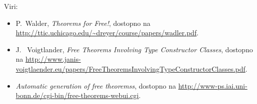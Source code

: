\documentclass{beamer}
\newcommand{\blue}[1]{\textcolor[rgb]{0,0,1}{#1}}
\newcommand{\red}[1]{\textcolor[rgb]{1,0,0}{#1}}
\begin{document}


\begin{frame}
Viri:
\begin{itemize}
\item P.~Walder, \emph{Theorems for Free!}, dostopno na \url{http://ttic.uchicago.edu/~dreyer/course/papers/wadler.pdf}.
\item J.~ Voigtlander, \emph{Free Theorems Involving Type Constructor Classes}, dostopno na \url{http://www.janis-voigtlaender.eu/papers/FreeTheoremsInvolvingTypeConstructorClasses.pdf}.
\item \emph{Automatic generation of free theoremss}, dostopno na \url{http://www-ps.iai.uni-bonn.de/cgi-bin/free-theorems-webui.cgi}.
\end{itemize}
\end{frame}
\end{document}
